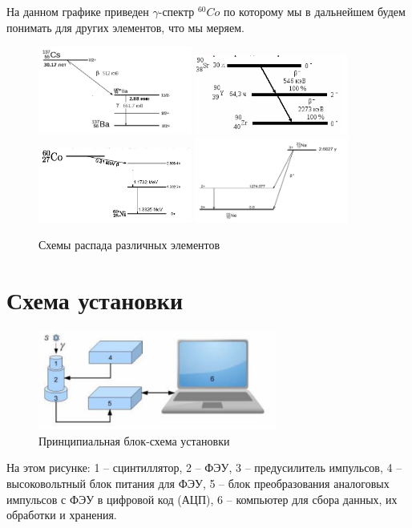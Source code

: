 \documentclass[a4paper, 12pt]{article}%
\begin{document}
На данном графике приведен $\gamma$-спектр $^{60}Co$ по которому мы в дальнейшем будем понимать для других элементов, что мы меряем.
\newpage
\begin{figure}[h]
\begin{center}
\includegraphics[width = 0.45\textwidth]{2.jpg}
\includegraphics[width = 0.45\textwidth]{3.jpg}
\includegraphics[width = 0.45\textwidth]{4.jpg}
\includegraphics[width = 0.45\textwidth]{5.jpg}
\caption{Схемы распада различных элементов}
\end{center}
\end{figure}

\section*{Схема установки}
\begin{figure}[h]
\begin{center}
\includegraphics[width = 0.7\textwidth]{6.jpg}
\caption{Принципиальная блок-схема установки}
\end{center}
\end{figure}
На этом рисунке: 1 – сцинтиллятор, 2 – ФЭУ, 3 – предусилитель импульсов, 4 – высоковольтный блок питания для ФЭУ, 5 – блок преобразования
аналоговых импульсов с ФЭУ в цифровой код (АЦП), 6 – компьютер для
сбора данных, их обработки и хранения.
\end{document}
